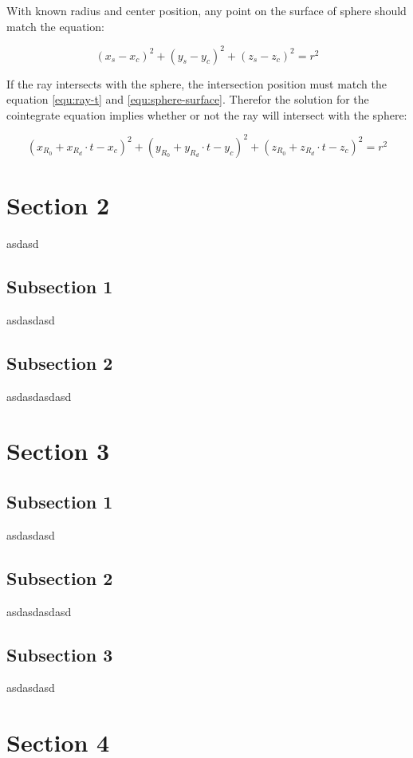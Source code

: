 With known radius and center position, any point on the surface of sphere should match the equation:

\begin{equation}
\label{equ:sphere-surface}
(x_{s} - x_{c})^2 + (y_{s} - y_{c})^2 + (z_{s} - z_{c})^2 = r^2
\end{equation}

If the ray intersects with the sphere, the intersection position must match the equation  \ref{equ:ray-t} and \ref{equ:sphere-surface}. Therefor the solution for the cointegrate equation implies whether or not the ray will intersect with the sphere:

\begin{equation}
\label{equ:ray-sphere}
(x_{R_{0}} + x_{R_{d}} \cdot t - x_{c})^2 + (y_{R_{0}} + y_{R_{d}} \cdot t - y_{c})^2 + (z_{R_{0}} + z_{R_{d}} \cdot t - z_{c})^2 = r^2
\end{equation}





\section{Section 2}
asdasd

\subsection{Subsection 1}
asdasdasd

\subsection{Subsection 2}
asdasdasdasd

\section{Section 3}

\subsection{Subsection 1}
asdasdasd

\subsection{Subsection 2}
asdasdasdasd

\subsection{Subsection 3}
asdasdasd

\section{Section 4}

